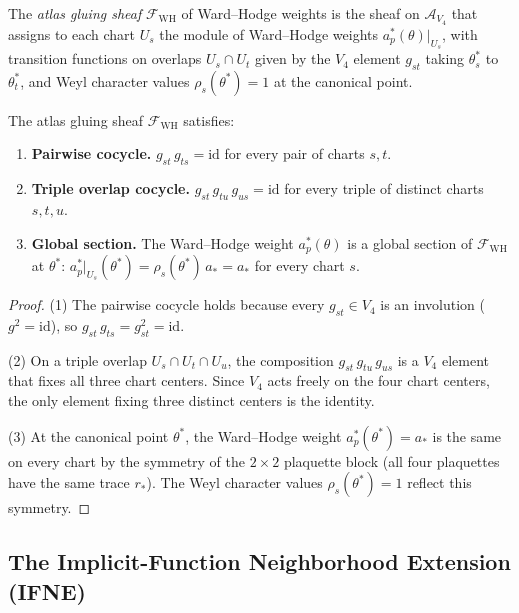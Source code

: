 \begin{definition}
\label{def:ags}
The \emph{atlas gluing sheaf} $\mathcal{F}_{\mathrm{WH}}$ of Ward--Hodge
weights is the sheaf on $\mathcal{A}_{V_{4}}$ that assigns to each chart
$U_{s}$ the module of Ward--Hodge weights
$a_{p}^{*}(\theta)|_{U_{s}}$, with transition functions on overlaps
$U_{s}\cap U_{t}$ given by the $V_{4}$ element $g_{st}$ taking
$\theta^{*}_{s}$ to $\theta^{*}_{t}$, and Weyl character values
$\rho_{s}(\theta^{*})=1$ at the canonical point.
\end{definition}

\begin{theorem}
\label{thm:ags_cocycle}
The atlas gluing sheaf $\mathcal{F}_{\mathrm{WH}}$ satisfies:
\begin{enumerate}
\item \textbf{Pairwise cocycle.} $g_{st}\,g_{ts}=\mathrm{id}$ for every
  pair of charts $s,t$.
\item \textbf{Triple overlap cocycle.}
  $g_{st}\,g_{tu}\,g_{us}=\mathrm{id}$ for every triple of distinct
  charts $s,t,u$.
\item \textbf{Global section.} The Ward--Hodge weight $a_{p}^{*}(\theta)$
  is a global section of $\mathcal{F}_{\mathrm{WH}}$ at $\theta^{*}$:
  $a_{p}^{*}|_{U_{s}}(\theta^{*})=\rho_{s}(\theta^{*})\,a_{*}=a_{*}$
  for every chart $s$.
\end{enumerate}
\end{theorem}

\begin{proof}
(1) The pairwise cocycle holds because every $g_{st}\in V_{4}$ is an
involution ($g^{2}=\mathrm{id}$), so $g_{st}\,g_{ts}=g_{st}^{2}=\mathrm{id}$.

(2) On a triple overlap $U_{s}\cap U_{t}\cap U_{u}$, the composition
$g_{st}\,g_{tu}\,g_{us}$ is a $V_{4}$ element that fixes all three chart
centers. Since $V_{4}$ acts freely on the four chart centers, the only
element fixing three distinct centers is the identity.

(3) At the canonical point $\theta^{*}$, the Ward--Hodge weight
$a_{p}^{*}(\theta^{*})=a_{*}$ is the same on every chart by the
symmetry of the $2\times 2$ plaquette block (all four plaquettes have
the same trace $r_{*}$). The Weyl character values
$\rho_{s}(\theta^{*})=1$ reflect this symmetry.
\end{proof}

\subsection{The Implicit-Function Neighborhood Extension (IFNE)}
\label{ssec:ifne}

